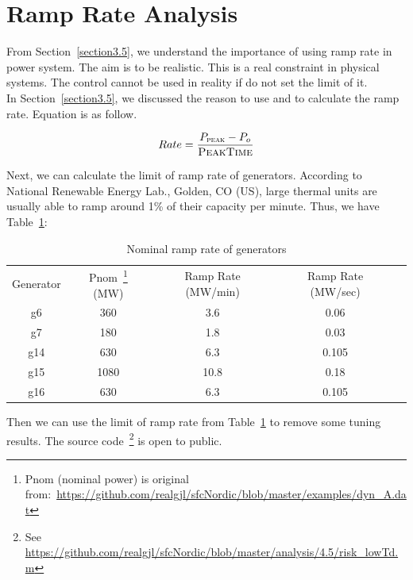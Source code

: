 \section{Ramp Rate Analysis} %
\label{section4.5}

From Section~\ref{section3.5}, we understand the importance of using ramp rate in power system. The aim is to be realistic. This is a real constraint in physical systems. The control cannot be used in reality if do not set the limit of it.\\

In Section~\ref{section3.5}, we discussed the reason to use  and  to calculate the ramp rate. Equation is as follow.

\begin{equation}
    Rate = \frac{P_{\textsc{peak}} - P_o}{\textsc{PeakTime}}
\end{equation}


Next, we can calculate the limit of ramp rate of generators. According to National Renewable Energy Lab., Golden, CO (US), \cite{osti_15016292} large thermal units are usually able to ramp around 1\% of their capacity per minute. Thus, we have Table~\ref{4_5_nominal_rate}:


\begin{table}[htbp]
  \centering
    \begin{tabular}{ccccc}
    Generator & Pnom~\footnote{Pnom (nominal power) is original from:~\href{https://github.com/realgjl/sfcNordic/blob/master/examples/dyn\_A.dat}{https://github.com/realgjl/sfcNordic/blob/master/examples/dyn\_A.dat}} (MW) & Ramp Rate (MW/min) & Ramp Rate (MW/sec)\\
    g6    & 360   & 3.6   & 0.06\\
    g7    & 180   & 1.8   & 0.03\\
    g14   & 630   & 6.3   & 0.105\\
    g15   & 1080  & 10.8  & 0.18\\
    g16   & 630   & 6.3   & 0.105\\
    \end{tabular}
  \caption{Nominal ramp rate of generators}
  \label{4_5_nominal_rate}
\end{table}

Then we can use the limit of ramp rate from Table~\ref{4_5_nominal_rate} to remove some tuning results. The source code~\footnote{See \href{https://github.com/realgjl/sfcNordic/blob/master/analysis/4.5/risk\_lowTd.m}{https://github.com/realgjl/sfcNordic/blob/master/analysis/4.5/risk\_lowTd.m}} is open to public. \\

